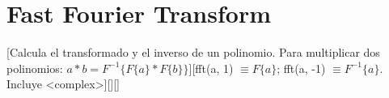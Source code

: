 \section{Fast Fourier Transform}
%
	[Calcula el transformado y el inverso de un polinomio. Para multiplicar dos polinomios:
	$a*b = F^{-1}\{F\{a\}*F\{b\}\} $][fft(a, 1) $\equiv F\{a\}$; fft(a, -1) $\equiv F^{-1}\{a\}$. Incluye <complex>][][]
	